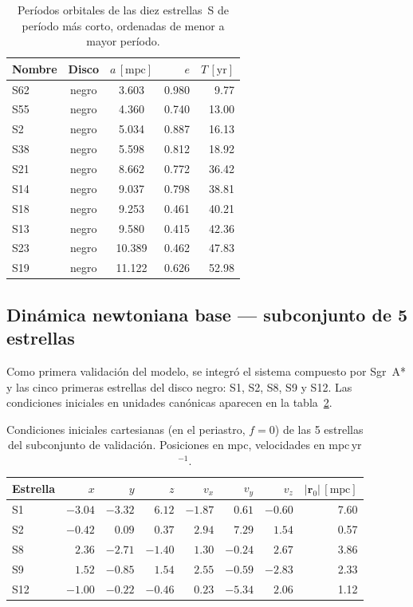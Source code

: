 \documentclass[12pt,a4paper]{article}
\newcommand{\SgrA}{Sgr~A*}
\newcommand{\mpc}{\text{mpc}}
\newcommand{\yr}{\text{yr}}
\begin{document}
\begin{table}[H]
  \centering
  \caption{Períodos orbitales de las diez estrellas~S de período más corto, ordenadas
    de menor a mayor período.}
  \label{tab:periodos}
  \begin{tabular}{lccrr}
    \toprule
    Nombre & Disco & $a\,[\mpc]$ & $e$ & $T\,[\yr]$ \\
    \midrule
    S62  & negro & 3.603  & 0.980 &   9.77 \\
    S55  & negro & 4.360  & 0.740 &  13.00 \\
    S2   & negro & 5.034  & 0.887 &  16.13 \\
    S38  & negro & 5.598  & 0.812 &  18.92 \\
    S21  & negro & 8.662  & 0.772 &  36.42 \\
    S14  & negro & 9.037  & 0.798 &  38.81 \\
    S18  & negro & 9.253  & 0.461 &  40.21 \\
    S13  & negro & 9.580  & 0.415 &  42.36 \\
    S23  & negro & 10.389 & 0.462 &  47.83 \\
    S19  & negro & 11.122 & 0.626 &  52.98 \\
    \bottomrule
  \end{tabular}
\end{table}

\subsection{Dinámica newtoniana base — subconjunto de 5 estrellas}
\label{subsec:5estrellas}

Como primera validación del modelo, se integró el sistema compuesto por \SgrA{} y
las cinco primeras estrellas del disco negro: S1, S2, S8, S9 y S12.  Las
condiciones iniciales en unidades canónicas aparecen en la
tabla~\ref{tab:estados_5}.

\begin{table}[H]
  \centering
  \caption{Condiciones iniciales cartesianas (en el periastro, $f=0$) de las
    5 estrellas del subconjunto de validación.  Posiciones en mpc, velocidades
    en mpc\,yr$^{-1}$.}
  \label{tab:estados_5}
  \begin{tabular}{lrrrrrrr}
    \toprule
    Estrella & $x$ & $y$ & $z$ & $v_x$ & $v_y$ & $v_z$ & $|\bm{r}_0|\,[\mpc]$ \\
    \midrule
    S1  & $-3.04$ & $-3.32$ & $ 6.12$ & $-1.87$ & $ 0.61$ & $-0.60$ & 7.60 \\
    S2  & $-0.42$ & $ 0.09$ & $ 0.37$ & $ 2.94$ & $ 7.29$ & $ 1.54$ & 0.57 \\
    S8  & $ 2.36$ & $-2.71$ & $-1.40$ & $ 1.30$ & $-0.24$ & $ 2.67$ & 3.86 \\
    S9  & $ 1.52$ & $-0.85$ & $ 1.54$ & $ 2.55$ & $-0.59$ & $-2.83$ & 2.33 \\
    S12 & $-1.00$ & $-0.22$ & $-0.46$ & $ 0.23$ & $-5.34$ & $ 2.06$ & 1.12 \\
    \bottomrule
  \end{tabular}
\end{table}
\end{document}
